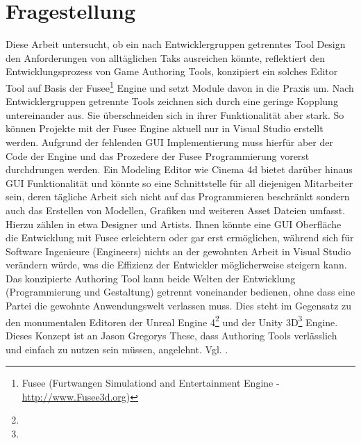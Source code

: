 \documentclass[pagesize, paper=a4, fontsize=12pt, titlepage=true, headings=small, headnosepline, abstractoff, liststotoc, nochapterprefix, plainheadsepline, twoside]{scrreprt}
\begin{document}
\section{Fragestellung}
Diese Arbeit untersucht, ob ein nach Entwicklergruppen getrenntes Tool Design den Anforderungen von alltäglichen Taks ausreichen könnte, reflektiert den Entwicklungsprozess von Game Authoring Tools, konzipiert ein solches Editor Tool auf Basis der Fusee\footnote{Fusee (Furtwangen Simulationd and Entertainment Engine - \url{http://www.Fusee3d.org})} Engine und setzt Module davon in die Praxis um. Nach Entwicklergruppen getrennte Tools zeichnen sich durch eine geringe Kopplung untereinander aus. Sie überschneiden sich in ihrer Funktionalität aber stark. So können Projekte mit der Fusee Engine aktuell nur in Visual Studio erstellt werden. Aufgrund der fehlenden GUI Implementierung muss hierfür aber der Code der Engine und das Prozedere der Fusee Programmierung vorerst durchdrungen werden. Ein Modeling Editor wie Cinema 4d bietet darüber hinaus GUI Funktionalität und könnte so eine Schnittstelle für all diejenigen Mitarbeiter sein, deren tägliche Arbeit sich nicht auf das Programmieren beschränkt sondern auch das Erstellen von Modellen, Grafiken und weiteren Asset Dateien umfasst. Hierzu zählen in etwa Designer und Artists. Ihnen könnte eine GUI Oberfläche die Entwicklung mit Fusee erleichtern oder gar erst ermöglichen, während sich für Software Ingenieure (Engineers) nichts an der gewohnten Arbeit in Visual Studio verändern würde, was die Effizienz der Entwickler möglicherweise steigern kann. Das konzipierte Authoring Tool kann beide Welten der Entwicklung (Programmierung und Gestaltung) getrennt voneinander bedienen, ohne dass eine Partei die gewohnte Anwendungswelt verlassen muss. Dies steht im Gegensatz zu den monumentalen Editoren der Unreal Engine 4\footnote{} und der Unity 3D\footnote{} Engine. 
Dieses Konzept ist an Jason Gregorys These, dass Authoring Tools verlässlich und einfach zu nutzen sein müssen, angelehnt. Vgl. .
\end{document}
